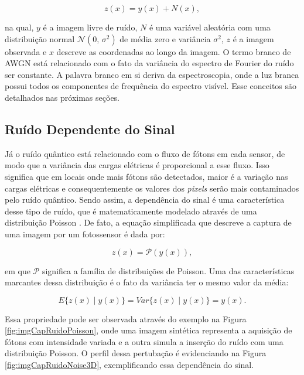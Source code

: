 \begin{equation}
z(x) = y(x) + N(x),
\label{eq:eqCapRuidoTermico}
\end{equation}

\noindent na qual, $y$ é a imagem livre de ruído, $N$ é uma variável aleatória com uma distribuição normal $\mathcal{N}(0,\,\sigma^{2})$ de média zero e variância $\sigma^{2}$, $z$ é a imagem observada e $x$ descreve as coordenadas ao longo da imagem. O termo branco de \acs{AWGN} está relacionado com  o fato da variância do espectro de Fourier do ruído ser constante. A palavra branco em si deriva da espectroscopia, onde a luz branca possui todos os componentes de frequência do espectro visível. Esse conceitos são detalhados nas próximas seções.


\subsection{Ruído Dependente do Sinal}

Já o ruído quântico está relacionado com o fluxo de fótons em cada sensor, de modo que a variância das cargas elétricas é proporcional a esse fluxo. Isso significa que em locais onde mais fótons são detectados, maior é a variação nas cargas elétricas e consequentemente os valores dos \textit{pixels} serão mais contaminados pelo ruído quântico. Sendo assim, a dependência do sinal é uma característica desse tipo de ruído, que é matematicamente modelado através de uma distribuição Poisson \cite{bertalmiodenoising2018}. De fato, a equação simplificada que descreve a captura de uma imagem por um fotossensor é dada por:

\begin{equation}
z(x) =  \mathcal{P}(y(x)),
\label{eq:eqCapRuidoQuantico}
\end{equation}

\noindent em que $\mathcal{P}$ significa a família de distribuições de Poisson. Uma das características marcantes dessa distribuição é o fato da variância ter o mesmo valor da média:

\begin{equation}
 E\{z(x)\mid y(x)\} =  Var\{z(x)\mid y(x)\} = y(x).
\label{eq:eqCapRuidoQuanticoMediaVar}
\end{equation}

Essa propriedade pode ser observada através do exemplo na Figura \ref{fig:imgCapRuidoPoisson}, onde uma imagem sintética representa a aquisição de fótons com intensidade variada e a outra simula a inserção do ruído com uma distribuição Poisson. O perfil dessa pertubação é evidenciando na Figura \ref{fig:imgCapRuidoNoise3D}, exemplificando essa dependência do sinal. 

